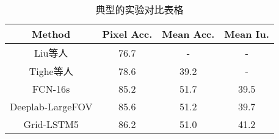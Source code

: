 \begin{table}[h] %
	\renewcommand\arraystretch{1.5}
	\centering
		\caption{典型的实验对比表格}	
		\begin{tabular}{*{4}{c}}
			\toprule
	 		Method & Pixel Acc. & Mean Acc. & Mean Iu.\\
			\midrule
			Liu等人\cite{liu2011sift}  & 76.7 & - & -\\
			Tighe等人\cite{tighe2013finding}  & 78.6 & 39.2 & -\\
			FCN-16s\cite{long2015fully} & 85.2 & 51.7 & 39.5\\
			Deeplab-LargeFOV\cite{chen14semantic} & 85.6 & 51.2 & 39.7\\
			\midrule
			Grid-LSTM5 & 86.2 & 51.0 & 41.2\\
			\bottomrule
		\end{tabular}	
		\label{tab:siftflow}
\end{table}
